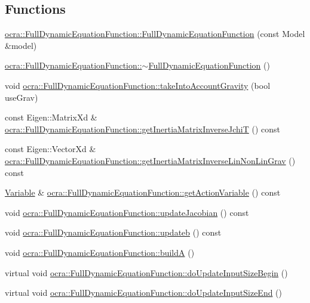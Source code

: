 \subsection*{Functions}
\begin{DoxyCompactItemize}
\item 
\hyperlink{group__constraint_ga778bffa6d85a494b3ee0c499400573a6}{ocra\+::\+Full\+Dynamic\+Equation\+Function\+::\+Full\+Dynamic\+Equation\+Function} (const Model \&model)
\item 
\hyperlink{group__constraint_gab3c2d35bef3c4d8733b7ab0e9ff48bfc}{ocra\+::\+Full\+Dynamic\+Equation\+Function\+::$\sim$\+Full\+Dynamic\+Equation\+Function} ()
\item 
void \hyperlink{group__constraint_ga673fd9a47a249d84ce527011a06417aa}{ocra\+::\+Full\+Dynamic\+Equation\+Function\+::take\+Into\+Account\+Gravity} (bool use\+Grav)
\item 
const Eigen\+::\+Matrix\+Xd \& \hyperlink{group__constraint_gaf2529ade8eb0c03afaaed34a4e82e144}{ocra\+::\+Full\+Dynamic\+Equation\+Function\+::get\+Inertia\+Matrix\+Inverse\+JchiT} () const
\item 
const Eigen\+::\+Vector\+Xd \& \hyperlink{group__constraint_ga6d0c4ebdceec4ea4569266155ca41172}{ocra\+::\+Full\+Dynamic\+Equation\+Function\+::get\+Inertia\+Matrix\+Inverse\+Lin\+Non\+Lin\+Grav} () const
\item 
\hyperlink{classocra_1_1Variable}{Variable} \& \hyperlink{group__constraint_gaa3c3057ca6a00bf88c372d0c467bed67}{ocra\+::\+Full\+Dynamic\+Equation\+Function\+::get\+Action\+Variable} () const
\item 
void \hyperlink{group__constraint_ga5b4ea2e9706cd848923c835e2df0eff5}{ocra\+::\+Full\+Dynamic\+Equation\+Function\+::update\+Jacobian} () const
\item 
void \hyperlink{group__constraint_gafab74164b55cd66d2b132915774b59f0}{ocra\+::\+Full\+Dynamic\+Equation\+Function\+::updateb} () const
\item 
void \hyperlink{group__constraint_ga19d9bbe4f78b4c396930388a70b8cd4b}{ocra\+::\+Full\+Dynamic\+Equation\+Function\+::buildA} ()
\item 
virtual void \hyperlink{group__constraint_gadbdce52af8ba057e93ea923db5a3ce04}{ocra\+::\+Full\+Dynamic\+Equation\+Function\+::do\+Update\+Input\+Size\+Begin} ()
\item 
virtual void \hyperlink{group__constraint_ga8c14a0ff3f87c32d030a3a1753b7a77e}{ocra\+::\+Full\+Dynamic\+Equation\+Function\+::do\+Update\+Input\+Size\+End} ()
\end{DoxyCompactItemize}


